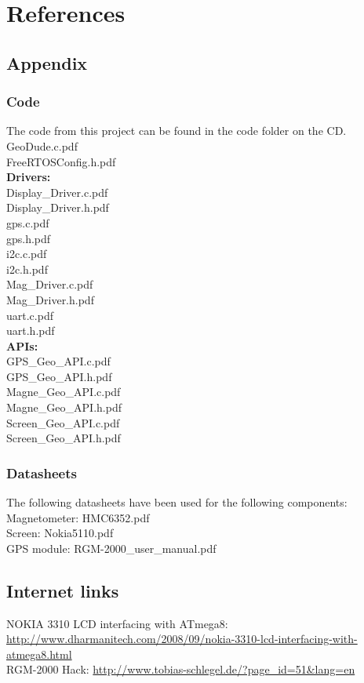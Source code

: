 \chapter{References}


\section{Appendix}

\subsection{Code}
The code from this project can be found in the code folder on the CD.\\
GeoDude.c.pdf\\
FreeRTOSConfig.h.pdf\\
\textbf{Drivers:}\\
Display\_Driver.c.pdf\\
Display\_Driver.h.pdf\\
gps.c.pdf\\
gps.h.pdf\\
i2c.c.pdf\\
i2c.h.pdf\\
Mag\_Driver.c.pdf\\
Mag\_Driver.h.pdf\\
uart.c.pdf\\
uart.h.pdf\\
\textbf{APIs:}\\
GPS\_Geo\_API.c.pdf\\
GPS\_Geo\_API.h.pdf\\
Magne\_Geo\_API.c.pdf\\
Magne\_Geo\_API.h.pdf\\
Screen\_Geo\_API.c.pdf\\
Screen\_Geo\_API.h.pdf\\

\subsection{Datasheets}
The following datasheets have been used for the following components:\\
Magnetometer: HMC6352.pdf\\
Screen: Nokia5110.pdf\\
GPS module: RGM-2000\_user\_manual.pdf\\

\section{Internet links}
NOKIA 3310 LCD interfacing with ATmega8: \url{http://www.dharmanitech.com/2008/09/nokia-3310-lcd-interfacing-with-atmega8.html}\label{[1]}\\
RGM-2000 Hack: \url{http://www.tobias-schlegel.de/?page_id=51&lang=en}\\